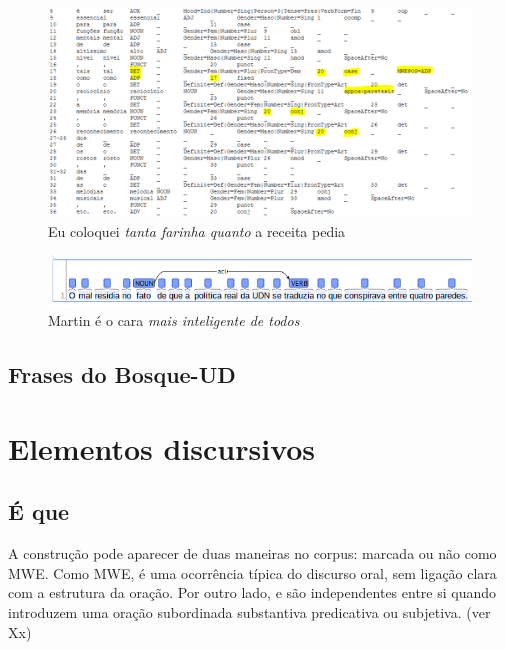 \documentclass[output=paper,colorlinks,citecolor=brown]{langscibook}
\begin{document}
\begin{figure}
    \centering
    \includegraphics[width=\textwidth,height=\textheight,keepaspectratio]{imagesDrive/image20.png}
    \caption{Eu coloquei \emph{tanta farinha quanto} a receita pedia}
    \label{fig:comparative1}
    \end{figure}{}

\begin{figure}
    \centering
    \includegraphics[width=\textwidth,height=\textheight,keepaspectratio]{imagesDrive/image27.png}
    \caption{Martin é o cara \emph{mais inteligente de todos}}
    \label{fig:comparative2}
\end{figure}{}

\subsection{Frases do Bosque-UD}


\section{Elementos discursivos}


	\subsection{É que}


	A construção  pode aparecer de duas maneiras no corpus: marcada ou não como MWE. Como MWE,  é uma ocorrência típica do discurso oral, sem ligação clara com a estrutura da oração. Por outro lado,  e  são independentes entre si quando introduzem uma oração subordinada substantiva predicativa ou subjetiva. (ver Xx)
\end{document}
